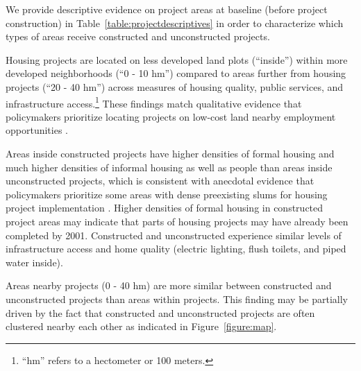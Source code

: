 \documentclass[12pt]{article}
\newcommand{\hmref}{
	``hm'' refers to a hectometer or 100 meters.
}
\begin{document}
We provide descriptive evidence on project areas at baseline (before project construction) in Table~\ref{table:projectdescriptives} in order to characterize which types of areas receive constructed and unconstructed projects.

Housing projects are located on less developed land plots (``inside'') within more developed neighborhoods (``0 - 10 hm'') compared to areas further from housing projects (``20 - 40 hm'') across measures of housing quality, public services, and infrastructure access.\footnote{\hmref}  These findings match qualitative evidence that policymakers prioritize locating projects on low-cost land nearby employment opportunities \citep{beninterview}.

Areas inside constructed projects have higher densities of formal housing and much higher densities of informal housing as well as people than areas inside unconstructed projects, which is consistent with anecdotal evidence that policymakers prioritize some areas with dense preexisting slums for housing project implementation \citep{hofmeyr2008risk}.  Higher densities of formal housing in constructed project areas may indicate that parts of housing projects may have already been completed by 2001.  Constructed and unconstructed experience similar levels of infrastructure access and home quality (electric lighting, flush toilets, and piped water inside).  

Areas nearby projects (0 - 40 hm) are more similar between constructed and unconstructed projects than areas within projects.  This finding may be partially driven by the fact that constructed and unconstructed projects are often clustered nearby each other as indicated in Figure~\ref{figure:map}.



\end{document}
